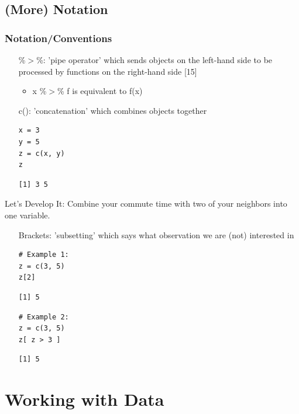 \subsection{(More) Notation}
\begin{frame}
	\frametitle{Notation/Conventions}

	\vspace{10pt}
	\begin{itemize}
		\item[\%$>$\%:] 'pipe operator' which sends objects on the left-hand side to be processed by functions on the right-hand side [15]
			\begin{itemize}
				\item x \%$>$\% f is equivalent to f(x)
			\end{itemize}
		\item[c():] 'concatenation' which combines objects together
			\begin{lstlisting}
x = 3
y = 5
z = c(x, y) 
z
			\end{lstlisting}
			\begin{verbatim}
[1] 3 5
			\end{verbatim}
	\end{itemize}

\newpage
	\begin{alertblock}{Let's Develop It:}
		Combine your commute time with two of your neighbors into one variable.
	\end{alertblock}	

\newpage
	\begin{itemize}		
		\item[Brackets:] 'subsetting' which says what observation we are (not) interested in
			\begin{lstlisting}
# Example 1:
z = c(3, 5) 
z[2]
			\end{lstlisting}
			\begin{verbatim}
[1] 5
			\end{verbatim}		
			\begin{lstlisting}
# Example 2:
z = c(3, 5) 
z[ z > 3 ]
			\end{lstlisting}
			\begin{verbatim}
[1] 5
			\end{verbatim}						
	\end{itemize}

\end{frame}


\section{Working with Data}

